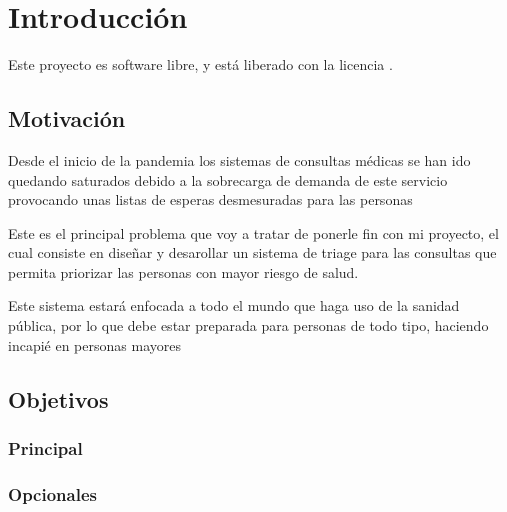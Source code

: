 \chapter{Introducción}

Este proyecto es software libre, y está liberado con la licencia \cite{gplv3}.

\section{Motivación}
Desde el inicio de la pandemia los sistemas de consultas médicas se han ido quedando saturados debido
a la sobrecarga de demanda de este servicio provocando unas listas de esperas desmesuradas para las personas

Este es el principal problema que voy a tratar de ponerle fin con mi proyecto, el cual consiste en diseñar y 
desarollar un sistema de triage para las consultas que permita priorizar las personas con mayor riesgo de salud.

Este sistema estará enfocada a todo el mundo que haga uso de la sanidad pública, por lo que debe estar preparada
para personas de todo tipo, haciendo incapié en personas mayores 

\section{Objetivos}

\subsection{Principal}

\subsection{Opcionales}

